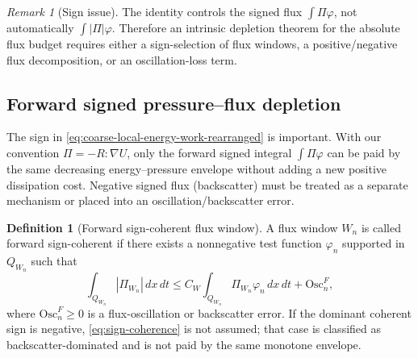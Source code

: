 \documentclass[11pt]{article}
\numberwithin{equation}{section}
\theoremstyle{plain}
\theoremstyle{definition}
\newtheorem{definition}[theorem]{Definition}
\theoremstyle{remark}
\newtheorem{remark}[theorem]{Remark}
\begin{document}
\begin{remark}[Sign issue]
The identity controls the signed flux \(\int\Pi\varphi\), not automatically \(\int|\Pi|\varphi\).  Therefore an intrinsic depletion theorem for the absolute flux budget requires either a sign-selection of flux windows, a positive/negative flux decomposition, or an oscillation-loss term.
\end{remark}


\subsection{Forward signed pressure--flux depletion}

The sign in \eqref{eq:coarse-local-energy-work-rearranged} is important.  With
our convention \(\Pi=-R:\nabla U\), only the forward signed integral
\(\int \Pi\varphi\) can be paid by the same decreasing energy--pressure envelope
without adding a new positive dissipation cost.  Negative signed flux
(backscatter) must be treated as a separate mechanism or placed into an
oscillation/backscatter error.

\begin{definition}[Forward sign-coherent flux window]
\label{def:signed-flux-window}
A flux window \(W_n\) is called forward sign-coherent if there exists a
nonnegative test function \(\varphi_n\) supported in \(Q_{W_n}\) such that
\begin{equation}
        \int_{Q_{W_n}}|\Pi_{W_n}|\,dx\,dt
        \le
        C_W\int_{Q_{W_n}}\Pi_{W_n}\varphi_n\,dx\,dt
        +
        \mathrm{Osc}^F_n,
        \label{eq:sign-coherence}
\end{equation}
where \(\mathrm{Osc}^F_n\ge0\) is a flux-oscillation or backscatter error.
If the dominant coherent sign is negative, \eqref{eq:sign-coherence} is not
assumed; that case is classified as backscatter-dominated and is not paid by
the same monotone envelope.
\end{definition}
\end{document}
